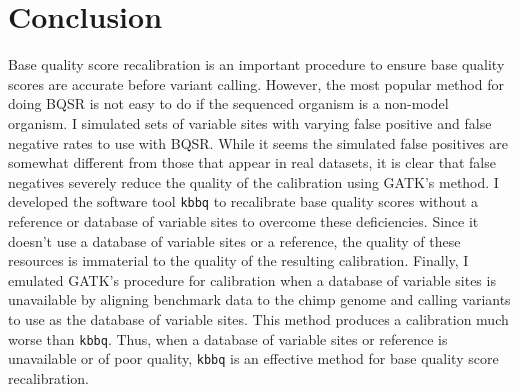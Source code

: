 \section{Conclusion}

Base quality score recalibration is an important procedure to ensure base quality scores are accurate before variant calling. However, the most popular method for doing BQSR is not easy to do if the sequenced organism is a non-model organism. I simulated sets of variable sites with varying false positive and false negative rates to use with BQSR. While it seems the simulated false positives are somewhat different from those that appear in real datasets, it is clear that false negatives severely reduce the quality of the calibration using GATK's method. I developed the software tool \texttt{kbbq} to recalibrate base quality scores without a reference or database of variable sites to overcome these deficiencies. Since it doesn't use a database of variable sites or a reference, the quality of these resources is immaterial to the quality of the resulting calibration. Finally, I emulated GATK's procedure for calibration when a database of variable sites is unavailable by aligning benchmark data to the chimp genome and calling variants to use as the database of variable sites. This method produces a calibration much worse than \texttt{kbbq}. Thus, when a database of variable sites or reference is unavailable or of poor quality, \texttt{kbbq} is an effective method for base quality score recalibration.

\printbibliography[segment=\therefsegment]{}

